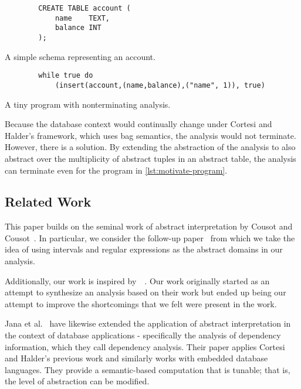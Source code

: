 \begin{listing}
    \begin{verbatim}
        CREATE TABLE account (
            name    TEXT,
            balance INT
        );
    \end{verbatim}
    \caption{A simple schema representing an account.}
    \label{lst:motivate-sql}
\end{listing}


\begin{listing}
    \begin{verbatim}
        while true do
            (insert(account,(name,balance),("name", 1)), true)
    \end{verbatim}
    \caption{A tiny program with nonterminating analysis.}
    \label{lst:motivate-program}
\end{listing}

Because the database context would continually change under Cortesi and Halder's framework, which uses bag semantics, the analysis would not terminate.
However, there is a solution.
By extending the abstraction of the analysis to also abstract over the multiplicity of abstract tuples in an abstract table, the analysis can terminate even for the program in \autoref{lst:motivate-program}.

\subsection{Related Work}\label{subsec:related-work}
This paper builds on the seminal work of abstract interpretation by Cousot and Cousot~\cite{cousot_abstract_1977}.
In particular, we consider the follow-up paper~\cite{cousot_abstract_1996} from which we take the idea of using intervals and regular expressions as the abstract domains in our analysis.

Additionally, our work is inspired by~~\cite{halder_abstract_2012}.
Our work originally started as an attempt to synthesize an analysis based on their work but ended up being our attempt to improve the shortcomings that we felt were present in the work.


Jana et al.~\cite{jana_extending_2020} have likewise extended the application of abstract interpretation in the context of database applications - specifically the analysis of dependency information, which they call dependency analysis.
Their paper applies Cortesi and Halder's previous work and similarly works with embedded database languages.
They provide a semantic-based computation that is tunable; that is, the level of abstraction can be modified.

